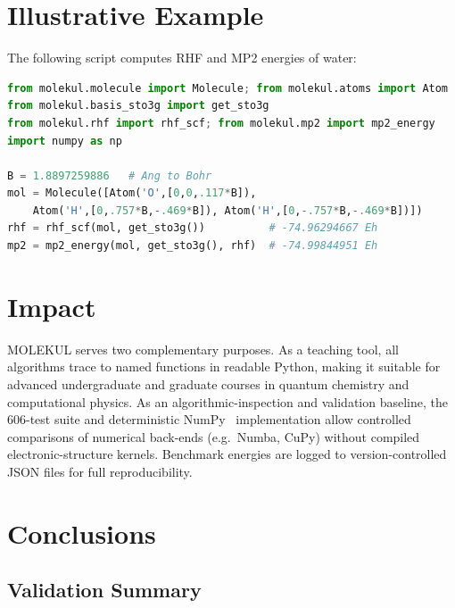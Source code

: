 \documentclass[1p,times]{elsarticle}
\begin{document}
\section{Illustrative Example}

The following script computes RHF and MP2 energies of water:

\begin{lstlisting}[language=Python]
from molekul.molecule import Molecule; from molekul.atoms import Atom
from molekul.basis_sto3g import get_sto3g
from molekul.rhf import rhf_scf; from molekul.mp2 import mp2_energy
import numpy as np

B = 1.8897259886   # Ang to Bohr
mol = Molecule([Atom('O',[0,0,.117*B]),
    Atom('H',[0,.757*B,-.469*B]), Atom('H',[0,-.757*B,-.469*B])])
rhf = rhf_scf(mol, get_sto3g())          # -74.96294667 Eh
mp2 = mp2_energy(mol, get_sto3g(), rhf)  # -74.99844951 Eh
\end{lstlisting}

\section{Impact}

MOLEKUL serves two complementary purposes.
As a teaching tool, all algorithms trace to named functions in readable Python,
making it suitable for advanced undergraduate and graduate courses in quantum
chemistry and computational physics.
As an algorithmic-inspection and validation baseline, the 606-test suite
and deterministic NumPy~\cite{harris2020} implementation allow controlled
comparisons of numerical back-ends (e.g.\ Numba, CuPy) without compiled
electronic-structure kernels.
Benchmark energies are logged to version-controlled JSON files for full
reproducibility.

\section{Conclusions}

\subsection{Validation Summary}
\end{document}
